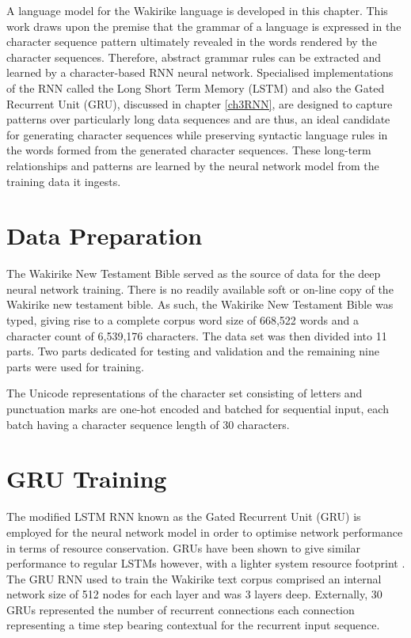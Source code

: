 A language model for the Wakirike language is developed in this chapter.  This work draws upon the premise that the grammar of a language is expressed in the character sequence pattern ultimately revealed in the words rendered by the character sequences.  Therefore, abstract grammar rules can be extracted and learned by a character-based RNN neural network.  Specialised implementations of the RNN called the Long Short Term Memory (LSTM) and also the Gated Recurrent Unit (GRU), discussed in chapter \ref{ch3RNN}, are designed to capture patterns over particularly long data sequences and are thus, an ideal candidate for generating character sequences while preserving syntactic language rules in the words formed from the generated character sequences.  These long-term relationships and patterns are learned by the neural network model from the training data it ingests.

\section{Data Preparation}
The Wakirike New Testament Bible served as the source of data for the deep neural network training.  There is no readily available soft or on-line copy of the Wakirike new testament bible. As such, the Wakirike New Testament Bible was typed, giving rise to a complete corpus word size of 668,522 words and a character count of 6,539,176 characters.  The data set was then divided into 11 parts. Two parts dedicated for testing and validation and the remaining nine parts were used for training.

The Unicode representations of the character set consisting of letters and punctuation marks are one-hot encoded and batched for sequential input, each batch having a character sequence length of 30 characters.


\section{GRU Training}

The modified LSTM RNN known as the Gated Recurrent Unit (GRU) is employed for the neural network model in order to optimise network performance in terms of resource conservation.  GRUs have been shown to give similar performance to regular LSTMs however, with a lighter system resource footprint \citep{cho2014learning}. The GRU RNN used to train the Wakirike text corpus comprised an internal network size of 512 nodes for each layer and was 3 layers deep. Externally, 30 GRUs represented  the number of recurrent connections each connection representing a time step bearing contextual for the recurrent input sequence. 

